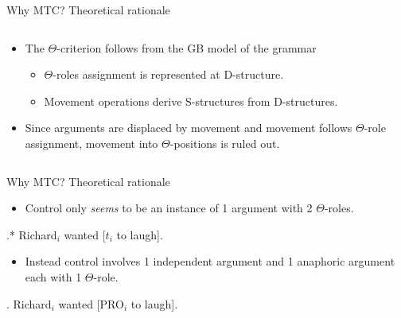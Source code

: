 \documentclass[Proposal]{subfiles}
\begin{document}
\begin{frame}
  {Why MTC?}
  {Theoretical rationale \parencite[see also][]{hornstein2001move}}
 
  \begin{columns}
    \begin{column}[T]{0.5\textwidth}
      \begin{itemize}
	\item The $\Theta$-criterion follows from the GB model of the grammar
	  \begin{itemize}
	    \item $\Theta$-roles assignment is represented at D-structure.
	    \item Movement operations derive S-structures from D-structures.
	  \end{itemize}
	\item Since arguments are displaced by movement and movement follows $\Theta$-role assignment, movement into $\Theta$-positions is ruled out.
      \end{itemize}
    \end{column}
    \begin{column}[T]{0.5\textwidth}
      {\small
  }
    \end{column}
  \end{columns}
\end{frame}
\begin{frame}
  {Why MTC?}
  {Theoretical rationale \parencite[see also][]{hornstein2001move}}
  \begin{itemize}
    \item Control only \textit{seems} to be an instance of 1 argument with 2 $\Theta$-roles.
  \end{itemize}
  \ex.* Richard$_i$ wanted [$t_i$ to laugh].

  \begin{itemize}
    \item Instead control involves 1 independent argument and 1 anaphoric argument each with 1 $\Theta$-role.
  \end{itemize}
  \ex. Richard$_i$ wanted [PRO$_i$ to laugh].

\end{frame}
\end{document}
